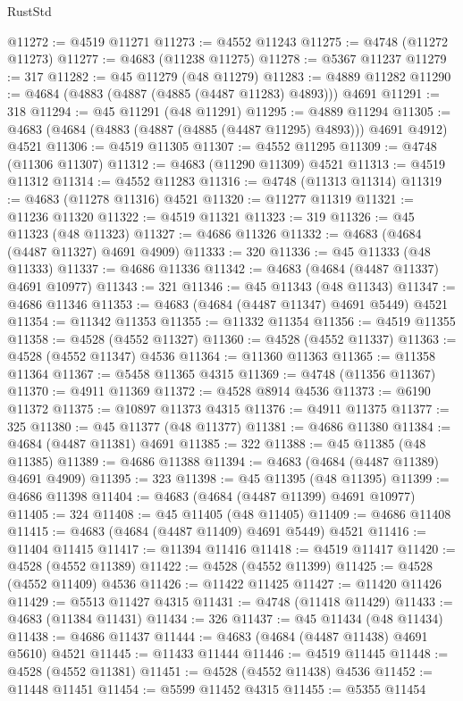 \begin{lexlean}{RustStd}
\begin{coremodule}
@11272 := @4519 @11271
@11273 := @4552 @11243
@11275 := @4748 (@11272 @11273)
@11277 := @4683 (@11238 @11275)
@11278 := @5367 @11237
@11279 := 317
@11282 := @45 @11279 (@48 @11279)
@11283 := @4889 @11282
@11290 := @4684 (@4883 (@4887 (@4885 (@4487 @11283) @4893))) @4691
@11291 := 318
@11294 := @45 @11291 (@48 @11291)
@11295 := @4889 @11294
@11305 := @4683 (@4684 (@4883 (@4887 (@4885 (@4487 @11295) @4893))) @4691 @4912) @4521
@11306 := @4519 @11305
@11307 := @4552 @11295
@11309 := @4748 (@11306 @11307)
@11312 := @4683 (@11290 @11309) @4521
@11313 := @4519 @11312
@11314 := @4552 @11283
@11316 := @4748 (@11313 @11314)
@11319 := @4683 (@11278 @11316) @4521
@11320 := @11277 @11319
@11321 := @11236 @11320
@11322 := @4519 @11321
@11323 := 319
@11326 := @45 @11323 (@48 @11323)
@11327 := @4686 @11326
@11332 := @4683 (@4684 (@4487 @11327) @4691 @4909)
@11333 := 320
@11336 := @45 @11333 (@48 @11333)
@11337 := @4686 @11336
@11342 := @4683 (@4684 (@4487 @11337) @4691 @10977)
@11343 := 321
@11346 := @45 @11343 (@48 @11343)
@11347 := @4686 @11346
@11353 := @4683 (@4684 (@4487 @11347) @4691 @5449) @4521
@11354 := @11342 @11353
@11355 := @11332 @11354
@11356 := @4519 @11355
@11358 := @4528 (@4552 @11327)
@11360 := @4528 (@4552 @11337)
@11363 := @4528 (@4552 @11347) @4536
@11364 := @11360 @11363
@11365 := @11358 @11364
@11367 := @5458 @11365 @4315
@11369 := @4748 (@11356 @11367)
@11370 := @4911 @11369
@11372 := @4528 @8914 @4536
@11373 := @6190 @11372
@11375 := @10897 @11373 @4315
@11376 := @4911 @11375
@11377 := 325
@11380 := @45 @11377 (@48 @11377)
@11381 := @4686 @11380
@11384 := @4684 (@4487 @11381) @4691
@11385 := 322
@11388 := @45 @11385 (@48 @11385)
@11389 := @4686 @11388
@11394 := @4683 (@4684 (@4487 @11389) @4691 @4909)
@11395 := 323
@11398 := @45 @11395 (@48 @11395)
@11399 := @4686 @11398
@11404 := @4683 (@4684 (@4487 @11399) @4691 @10977)
@11405 := 324
@11408 := @45 @11405 (@48 @11405)
@11409 := @4686 @11408
@11415 := @4683 (@4684 (@4487 @11409) @4691 @5449) @4521
@11416 := @11404 @11415
@11417 := @11394 @11416
@11418 := @4519 @11417
@11420 := @4528 (@4552 @11389)
@11422 := @4528 (@4552 @11399)
@11425 := @4528 (@4552 @11409) @4536
@11426 := @11422 @11425
@11427 := @11420 @11426
@11429 := @5513 @11427 @4315
@11431 := @4748 (@11418 @11429)
@11433 := @4683 (@11384 @11431)
@11434 := 326
@11437 := @45 @11434 (@48 @11434)
@11438 := @4686 @11437
@11444 := @4683 (@4684 (@4487 @11438) @4691 @5610) @4521
@11445 := @11433 @11444
@11446 := @4519 @11445
@11448 := @4528 (@4552 @11381)
@11451 := @4528 (@4552 @11438) @4536
@11452 := @11448 @11451
@11454 := @5599 @11452 @4315
@11455 := @5355 @11454

\end{coremodule}
\end{lexlean}
